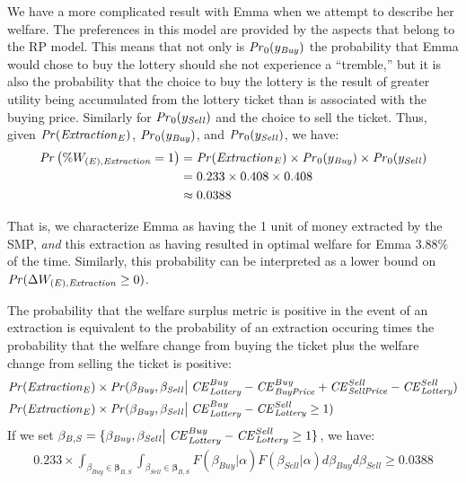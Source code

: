 \documentclass[../main.tex]{subfiles}
\begin{document}
We have a more complicated result with Emma when we attempt to describe her welfare.
The preferences in this model are provided by the aspects that belong to the RP model.
This means that not only is ${\mathit{Pr}}_0(y_{\mathit{Buy}})$ the probability that Emma would chose to buy the lottery should she not experience a \enquote{tremble,} but it is also the probability that the choice to buy the lottery is the result of greater utility being accumulated from the lottery ticket than is associated with the buying price.
Similarly for ${\mathit{Pr}}_0(y_{\mathit{Sell}})$ and the choice to sell the ticket.
Thus, given ${\mathit{Pr}}(\mathit{Extraction}_E)$, ${\mathit{Pr}}_0(y_{\mathit{Buy}})$, and ${\mathit{Pr}}_0(y_{\mathit{Sell}})$, we have:
\begin{align}
	\begin{split}
		{\ensuremath{\mathit{Pr}}}\left(\% W_{(E),\mathit{Extraction}} = 1\right) &= {\mathit{Pr}}(\mathit{Extraction}_E) \times {\ensuremath{\mathit{Pr}}}_0(y_{\mathit{Buy}}) \times {\ensuremath{\mathit{Pr}}}_0(y_{\mathit{Sell}})\\
		&= 0.233 \times 0.408 \times 0.408\\
		&\approx 0.0388
	\end{split}
\end{align}

That is, we characterize Emma as having the 1 unit of money extracted by the SMP, \textit{and} this extraction as having resulted in optimal welfare for Emma $3.88\%$ of the time.
Similarly, this probability can be interpreted as a lower bound on ${\mathit{Pr}}(\Delta W_{(E),\mathit{Extraction}} \geq 0)$.

The probability that the welfare surplus metric is positive in the event of an extraction is equivalent to the probability of an extraction occuring times the probability that the welfare change from buying the ticket plus the welfare change from selling the ticket is positive:
\begin{align*}
{\ensuremath{\mathit{Pr}}}(\mathit{Extraction}_E) &\times {\ensuremath{\mathit{Pr}}}(\beta_{\mathit{Buy}},\beta_{\mathit{Sell}} \big| \; {\mathit{CE}}_{\mathit{Lottery}}^{Buy} - {\mathit{CE}}_{\mathit{Buy Price}}^{Buy} + {\mathit{CE}}_{\mathit{Sell Price}}^{Sell} - {\mathit{CE}}_{\mathit{Lottery}}^{Sell} )\\
{\mathit{Pr}}(\mathit{Extraction}_E) &\times {\ensuremath{\mathit{Pr}}}(\beta_{\mathit{Buy}},\beta_{\mathit{Sell}} \big| \; {\mathit{CE}}_{\mathit{Lottery}}^{Buy} - {\mathit{CE}}_{\mathit{Lottery}}^{Sell} \geq 1 )
\end{align*}
If we set $\mathbf{\beta_{\mathit{B,S}}} = \{ \beta_{\mathit{Buy}},\beta_{\mathit{Sell}} \big| \; {\mathit{CE}}_{\mathit{Lottery}}^{Buy} - {\mathit{CE}}_{\mathit{Lottery}}^{Sell} \geq 1\}$,{\footnotemark} we have:
\begin{align}
	0.233 \times \int_{\beta_{\mathit{Buy}} \in \mathbf{\beta_{\mathit{B,S}}}} \int_{\beta_{\mathit{Sell}} \in \mathbf{\beta_{\mathit{B,S}}}} F(\beta_{\mathit{Buy}} | \alpha) F(\beta_{\mathit{Sell}}|\alpha) d\beta_{\mathit{Buy}} d\beta_{\mathit{Sell}} \geq 0.0388
\end{align}
\end{document}
